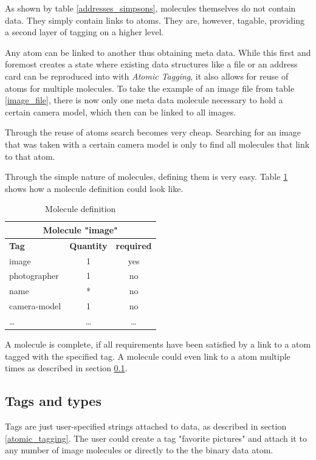 \documentclass[12pt,a4paper,notitlepage,twocolumn,oneside]{article}
\newcommand{\at}{{\emph{Atomic Tagging}}}
\begin{document}
As shown by table \ref{addresses_simpsons}, molecules themselves do not contain data. They simply contain links to atoms. They are, however, tagable, providing a second layer of tagging on a higher level.

Any atom can be linked to another thus obtaining meta data. While this first and foremost creates a state where existing data structures like a file or an address card can be reproduced into with \at{,} it also allows for reuse of atoms for multiple molecules. To take the example of an image file from table \ref{image_file}, there is now only one meta data molecule necessary to hold a certain camera model, which then can be linked to all images.

Through the reuse of atoms search becomes very cheap. Searching for an image that was taken with a certain camera model is only to find all molecules that link to that atom. 

Through the simple nature of molecules, defining them is very easy. Table \ref{molecule_definition} shows how a molecule definition could look like.

\begin{table}[htp]
\centering
\begin{tabular}{|l|c|c|}
\hline
\multicolumn{3}{|c|}{\textbf{Molecule "image"}} \\
\hline
\textbf{Tag} & \textbf{Quantity} & \textbf{required} \\
\hline
image & 1 & yes \\
photographer & 1 & no \\
name & * & no \\
camera-model & 1 & no \\
\ldots & \ldots & \ldots \\
\hline
\end{tabular}
\caption{Molecule definition}
\label{molecule_definition}
\end{table}

A molecule is complete, if all requirements have been satisfied by a link to a atom tagged with the specified tag. A molecule could even link to a atom multiple times as described in section \ref{tags_types}.

\subsection{Tags and types}\label{tags_types}
Tags are just user-specified strings attached to data, as described in section \ref{atomic_tagging}. The user could create a tag "favorite pictures" and attach it to any number of image molecules or directly to the the binary data atom.
\end{document}

